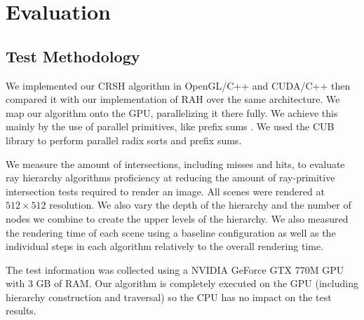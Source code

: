 
\chapter{Evaluation}
\label{chapter:evaluation}

\section{Test Methodology}
\label{section:test-methodology}

We implemented our CRSH algorithm in OpenGL/C++ and CUDA/C++ then compared it with our implementation of RAH \cite{Roger07} over the same architecture. We map our algorithm onto the GPU, parallelizing it there fully. We achieve this mainly by the use of parallel primitives, like prefix sums \cite{Blelloch90}. We used the CUB \cite{Merrill09}  \cite{Merrill11} library to perform parallel radix sorts and prefix sums.

\medskip

We measure the amount of intersections, including misses and hits, to evaluate ray hierarchy algorithms proficiency at reducing the amount of ray-primitive intersection tests required to render an image. All scenes were rendered at $512\times512$ resolution. We also vary the depth of the hierarchy and the number of nodes we combine to create the upper levels of the hierarchy. We also measured the rendering time of each scene using a baseline configuration as well as the individual steps in each algorithm relatively to the overall rendering time.

\medskip

The test information was collected using a NVIDIA GeForce GTX 770M GPU with 3 GB of RAM. Our algorithm is completely executed on the GPU (including hierarchy construction and traversal) so the CPU has no impact on the test results.

